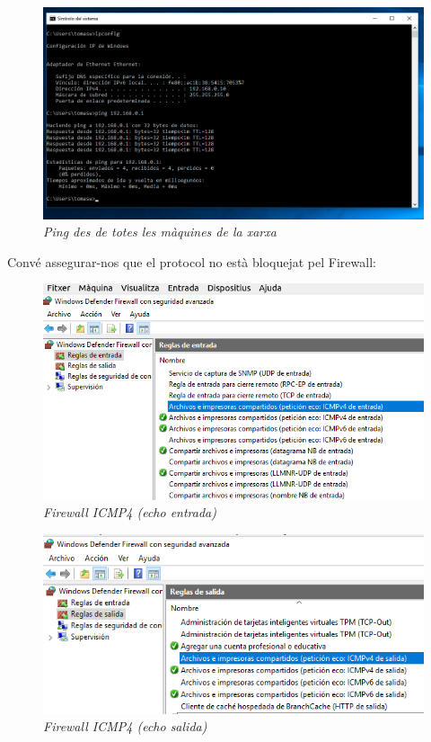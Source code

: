 \documentclass[
  a4paper,
]{article}
\begin{document}
\begin{figure}
\centering
\includegraphics{png/ping.png}
\caption{\emph{Ping des de totes les màquines de la xarxa}}
\end{figure}

Convé assegurar-nos que el protocol no està bloquejat pel Firewall:

\begin{figure}
\centering
\includegraphics{png/FirewallICMP4Entrada.png}
\caption{\emph{Firewall ICMP4 (echo entrada)}}
\end{figure}

\begin{figure}
\centering
\includegraphics{png/FirewallICMP4Salida.png}
\caption{\emph{Firewall ICMP4 (echo salida)}}
\end{figure}
\end{document}
